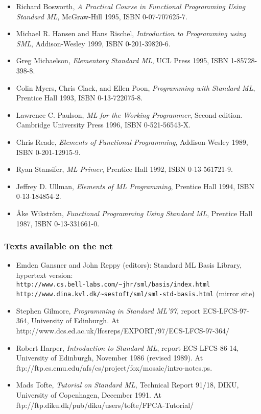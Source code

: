 \documentclass[fleqn]{article}
\begin{document}
\begin{itemize}
\item Richard Bosworth, {\em A Practical Course in Functional
    Programming Using Standard ML}, McGraw-Hill 1995, ISBN
  0-07-707625-7.
\item Michael R. Hansen and Hans Rischel, \emph{Introduction to
    Programming using SML}, Addison-Wesley 1999, ISBN 0-201-39820-6.
\item Greg Michaelson, {\em Elementary Standard ML\/}, UCL Press 1995,
  ISBN 1-85728-398-8.
\item Colin Myers, Chris Clack, and Ellen Poon, {\em Programming with
    Standard ML\/}, Prentice Hall 1993, ISBN 0-13-722075-8.
\item Lawrence C. Paulson, {\em ML for the Working Programmer\/},
  Second edition.  Cambridge University Press 1996, ISBN
  0-521-56543-X.  
\item Chris Reade, {\em Elements of Functional Programming\/},
  Addison-Wesley 1989, ISBN 0-201-12915-9.
\item Ryan Stansifer, {\em ML Primer\/}, Prentice Hall 1992, ISBN
  0-13-561721-9.
\item Jeffrey D. Ullman, {\em Elements of ML Programming\/}, Prentice
  Hall 1994, ISBN 0-13-184854-2.
\item {\AA}ke Wikstr{\"o}m, {\em Functional Programming Using Standard
    ML\/}, Prentice Hall 1987, ISBN 0-13-331661-0.
\end{itemize}

\subsubsection*{Texts available on the net}

\begin{itemize}
\item Emden Gansner and John Reppy (editors): Standard ML Basis
  Library, hypertext version:\\ 
  \verb#http://www.cs.bell-labs.com/~jhr/sml/basis/index.html# \\
  \verb#http://www.dina.kvl.dk/~sestoft/sml/sml-std-basis.html#
  (mirror site)
  
\item Stephen Gilmore, \emph{Programming in Standard ML'97}, report
  ECS-LFCS-97-364, University of Edinburgh.  At
  http://www.dcs.ed.ac.uk/lfcsreps/EXPORT/97/ECS-LFCS-97-364/
  
\item Robert Harper, {\em Introduction to Standard ML\/}, report
  ECS-LFCS-86-14, University of Edinburgh, November 1986 (revised
  1989).  At
  ftp://ftp.cs.cmu.edu/afs/cs/project/fox/mosaic/intro-notes.ps.

\item Mads Tofte, {\em Tutorial on Standard ML\/}, Technical Report
  91/18, DIKU, University of Copenhagen, December 1991.  At 
  ftp://ftp.diku.dk/pub/diku/users/tofte/FPCA-Tutorial/
\end{itemize}



\end{document}
